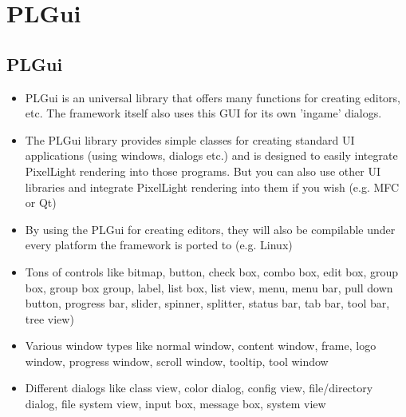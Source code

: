 \chapter{PLGui}




\section{PLGui}
\begin{itemize}
\item{PLGui is an universal library that offers many functions for creating editors, etc. The framework itself also uses this GUI for its own 'ingame' dialogs.}
\item{The PLGui library provides simple classes for creating standard UI applications (using windows, dialogs etc.) and is designed to easily integrate PixelLight rendering into those programs. But you can also use other UI libraries and integrate PixelLight rendering into them if you wish (e.g. MFC or Qt)}
\item{By using the PLGui for creating editors, they will also be compilable under every platform the framework is ported to (e.g. Linux)}
\item{Tons of controls like bitmap, button, check box, combo box, edit box, group box, group box group, label, list box, list view, menu, menu bar, pull down button, progress bar, slider, spinner, splitter, status bar, tab bar, tool bar, tree view)}
\item{Various window types like normal window, content window, frame, logo window, progress window, scroll window, tooltip, tool window}
\item{Different dialogs like class view, color dialog, config view, file/directory dialog, file system view, input box, message box, system view}
\end{itemize}
